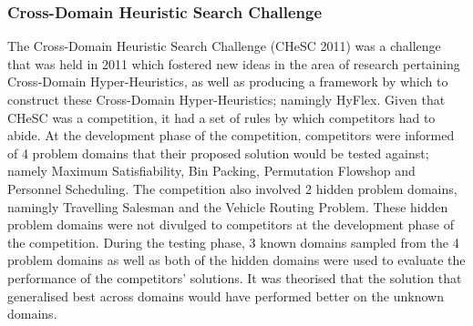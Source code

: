 \documentclass[a4paper,12pt]{article}
\begin{document}
            \subsubsection{Cross-Domain Heuristic Search Challenge}
            \par{The Cross-Domain Heuristic Search Challenge (CHeSC 2011)  was a challenge that was held in 2011 which fostered new ideas in the area of research pertaining Cross-Domain Hyper-Heuristics, as well as producing a framework by which to construct these Cross-Domain Hyper-Heuristics; namingly HyFlex\cite{hyflex2012}.\newline
            \newline
            Given that CHeSC was a competition, it had a set of rules by which competitors had to abide. At the development phase of the competition, competitors were informed of 4 problem domains that their proposed solution would be tested against; namely Maximum Satisfiability, Bin Packing, Permutation Flowshop and Personnel Scheduling. The competition also involved 2 hidden problem domains, namingly Travelling Salesman and the Vehicle Routing Problem. These hidden problem domains were not divulged to competitors at the development phase of the competition. \newline
            \newline
            During the testing phase, 3 known domains sampled from the 4 problem domains as well as both of the hidden domains were used to evaluate the performance of the competitors' solutions. It was theorised that the solution that generalised best across domains would have performed better on the unknown domains\cite{hhcds}.}  
\end{document}
